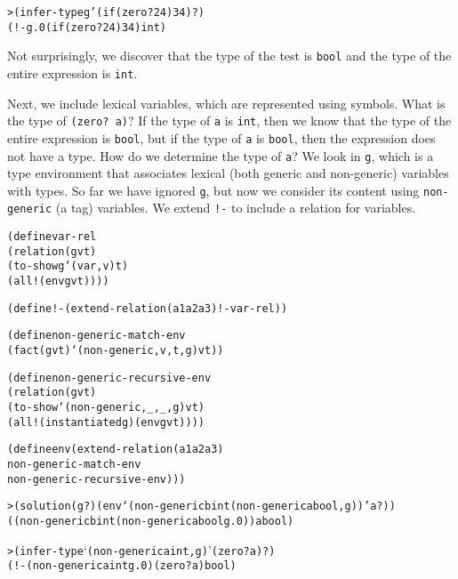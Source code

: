\begin{alltt}
> (infer-type g '(if (zero? 24) 3 4) ?)
(!- g.0 (if (zero? 24) 3 4) int)
\end{alltt}

\noindent
Not surprisingly, we discover that the type of the test is \texttt{bool}
and the type of the entire expression is \texttt{int}.

Next, we include lexical variables, which are represented using
symbols.  What is the type of \texttt{(zero? a)}?  If the type of
\texttt{a} is \texttt{int}, then we know that the type of the entire
expression is \texttt{bool}, but if the type of \texttt{a} is
\texttt{bool}, then the expression does not have a type.  How do we
determine the type of \texttt{a}?  We look in \texttt{g}, which is a
type environment that associates lexical (both generic and
non-generic) variables with types.  So far we have ignored \texttt{g},
but now we consider its content using \texttt{non-generic} (a tag)
variables.  We extend \texttt{!-} to include a relation for variables.

\begin{alltt}
(define var-rel
  (relation (g v t)
    (to-show g `(var ,v) t)
    (all! (env g v t))))

(define !- (extend-relation (a1 a2 a3) !- var-rel))
\end{alltt}

\begin{alltt}
(define non-generic-match-env
  (fact (g v t) `(non-generic ,v ,t ,g) v t))

(define non-generic-recursive-env
  (relation (g v t)
    (to-show `(non-generic ,_ ,_ ,g) v t)
    (all! (instantiated g) (env g v t))))
\end{alltt}

\begin{alltt}
(define env (extend-relation (a1 a2 a3)
              non-generic-match-env
              non-generic-recursive-env)))
\end{alltt}

\begin{alltt}
> (solution (g ?) (env `(non-generic b int (non-generic a bool ,g)) 'a ?))
((non-generic b int (non-generic a bool g.0)) a bool)
\end{alltt}

\begin{alltt}
> (infer-type `(non-generic a int ,g) '(zero? a) ?)
(!- (non-generic a int g.0) (zero? a) bool)
\end{alltt}

